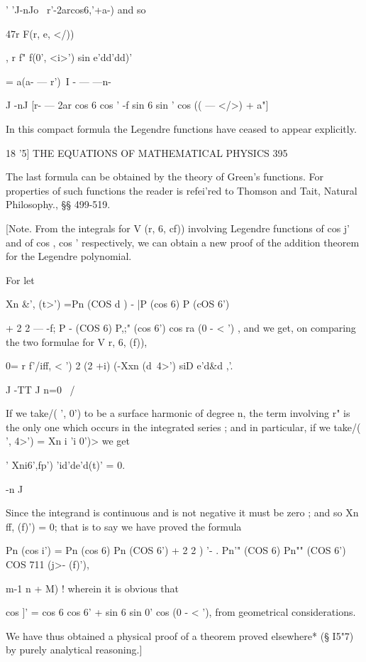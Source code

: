  ' 'J-nJo \ r'-2arcos6,'+a-) and so

47r F(r, e, </))

, r f" f(0', <i>') sin e'dd'dd)'

= a(a- — r')\ I - — —n-

J -nJ [r- — 2ar cos 6 cos ' -f sin 6 sin ' cos (( — </>) + a"]

In this compact formula the Legendre functions have ceased to appear
explicitly.



18 '5] THE EQUATIONS OF MATHEMATICAL PHYSICS 395

The last formula can be obtained by the theory of Green's functions.
For properties of such functions the reader is refei'red to Thomson
and Tait, Natural Philosophy., §§ 499-519.

[Note. From the integrals for V (r, 6, cf)) involving Legendre
functions of cos j' and of cos , cos ' respectively, we can obtain a
new proof of the addition theorem for the Legendre polynomial.

For let

Xn \&', (t>') =Pn (COS d ) - |P (cos 6) P (cOS 6')

+ 2 2 — -f; P - (COS 6) P,;" (cos 6') cos ra (0 - < ') , and we get,
on comparing the two formulae for V r, 6, (f)),

0= r f'/iff, < ') 2 (2 +i) (-Xxn (d\ 4>') siD e'd\&d ,'.

J -TT J n=0 \ /

If we take/( ', 0') to be a surface harmonic of degree n, the term
involving r" is the only one which occurs in the integrated series ;
and in particular, if we take/( ', 4>') = Xn i 'i 0')> we get

' Xni6',fp') 'id'de'd(t)' = 0.



-n J

Since the integrand is continuous and is not negative it must be zero
; and so Xn ff, (f)') = 0; that is to say we have proved the formula

Pn (cos i') = Pn (cos 6) Pn (COS 6') + 2 2 ) '- . Pn'" (COS 6) Pn""
(COS 6') COS 711 (j>- (f)'),

m-1 n + M) ! wherein it is obvious that

cos ]' = cos 6 cos 6' + sin 6 sin 0' cos (0 - < '), from geometrical
considerations.

We have thus obtained a physical proof of a theorem proved elsewhere*
(§ I5"7) by purely analytical reasoning.]


